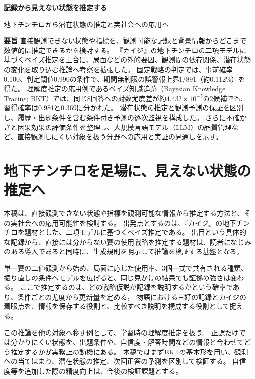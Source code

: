 \documentclass[10pt,a4paper]{article}
\begin{document}
\thispagestyle{fancy}
\begin{center}
{\sffamily\bfseries\fontsize{19}{25}\selectfont 記録から見えない状態を推定する\par}
\vspace{2mm}
{\sffamily\large 地下チンチロから潜在状態の推定と実社会への応用へ\par}
\end{center}
\vspace{-2mm}
\noindent\textbf{要旨}\enspace
直接観測できない状態や指標を、観測可能な記録と背景情報からどこまで数値的に推定できるかを検討する。
『カイジ』の地下チンチロの二項モデルに基づくベイズ推定を土台に、局面などの外的要因、観測間の依存関係、潜在状態の変化を取り込む推論へ考察を拡張した。
固定戦略の判定では、事前確率0.100、判定閾値0.990の条件で、期間無制限の誤警報上界$1/891$（約0.112\%）を得た。
理解度推定の応用例であるベイズ知識追跡（Bayesian Knowledge Tracing; BKT）では、同じ8回答への対数尤度差が約$4.432\times10^{-5}$の2候補でも、習得確率は0.984と0.369に分かれた。
潜在状態の推定と観測予測の保証を区別し、履歴・出題条件を含む条件付き予測の逐次監視を構成した。
さらに不確かさと因果効果の評価条件を整理し、大規模言語モデル（LLM）の品質管理など、直接観測しにくい対象を扱う分野への応用と実証の見通しを示す。

\section{地下チンチロを足場に、見えない状態の推定へ}
本稿は、直接観測できない状態や指標を観測可能な情報から推定する方法と、その実社会への応用可能性を検討する。
出発点とするのは、『カイジ』の地下チンチロ\cite{kaiji}を題材とした、二項モデルに基づくベイズ推定である。
出目という具体的な記録から、直接には分からない賽の使用戦略を推定する題材は、読者になじみのある導入であると同時に、生成規則を明示して推論を検証する基盤となる。

単一賽の二値観測から始め、局面に応じた使用率、3個一式で共有される種類、振り直しの条件へモデルを広げると、同じ見かけの結果でも証拠の強さは変わる。
ここで推定するのは、どの戦略仮説が記録を説明するかという確率であり、条件ごとの尤度から更新量を定める。
物語における三好の記録とカイジの着眼点を、情報を保存する役割と、比較すべき説明を構成する役割として捉える。

この推論を他の対象へ移す例として、学習時の理解度推定を扱う。
正誤だけでは分かりにくい状態を、出題条件や、自信度・解答時間などの情報と合わせてどう推定するかが実務上の動機にある。
本稿ではまずBKTの基本形を用い、観測への当てはまり、潜在状態の推定、次回正答の予測を区別して検証する。
自信度等を追加した際の精度向上は、今後の検証課題とする。
\end{document}
